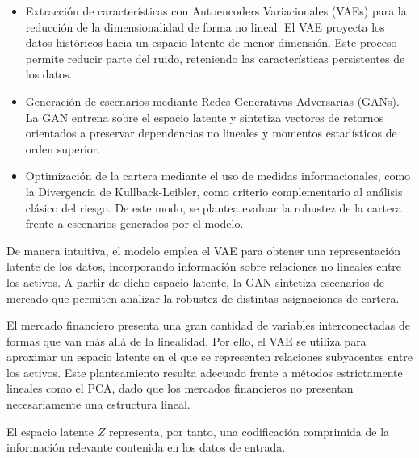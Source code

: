 \begin{itemize}
\item Extracción de características con Autoencoders Variacionales (VAEs) para la reducción de la dimensionalidad de forma no lineal. El VAE proyecta los datos históricos hacia un espacio latente de menor dimensión. Este proceso permite reducir parte del ruido, reteniendo las características persistentes de los datos.

\item Generación de escenarios mediante Redes Generativas Adversarias (GANs). La GAN entrena sobre el espacio latente y sintetiza vectores de retornos orientados a preservar dependencias no lineales y momentos estadísticos de orden superior.

\item Optimización de la cartera mediante el uso de medidas informacionales, como la Divergencia de Kullback-Leibler, como criterio complementario al análisis clásico del riesgo. De este modo, se plantea evaluar la robustez de la cartera frente a escenarios generados por el modelo.
\end{itemize}

De manera intuitiva, el modelo emplea el VAE para obtener una representación latente de los datos, incorporando información sobre relaciones no lineales entre los activos. A partir de dicho espacio latente, la GAN sintetiza escenarios de mercado que permiten analizar la robustez de distintas asignaciones de cartera.

El mercado financiero presenta una gran cantidad de variables interconectadas de formas que van más allá de la linealidad. Por ello, el VAE se utiliza para aproximar un espacio latente en el que se representen relaciones subyacentes entre los activos. Este planteamiento resulta adecuado frente a métodos estrictamente lineales como el PCA, dado que los mercados financieros no presentan necesariamente una estructura lineal.

El espacio latente $Z$ representa, por tanto, una codificación comprimida de la información relevante contenida en los datos de entrada.

